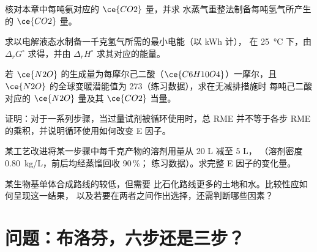 \begin{exercise}[$\star\star$]\label{exo:b3:green-industrial:7}
核对本章中每吨氨对应的 $\ce{CO2}$ 量，并求
水蒸气重整法制备每吨氢气所产生的 $\ce{CO2}$ 量。
\end{exercise}

\begin{exercise}[$\star\star$]\label{exo:b3:green-industrial:8}
求以电解液态水制备一千克氢气所需的最小电能（以 kWh 计），
在 \qty{25}{\celsius} 下，由 $\Delta_rG^\circ$ 求得，并由 $\Delta_rH^\circ$ 求其对应的能量。
\end{exercise}

\begin{exercise}[$\star\star$]\label{exo:b3:green-industrial:9}
若 $\ce{N2O}$ 的生成量为每摩尔己二酸（$\ce{C6H10O4}$）一摩尔，且
$\ce{N2O}$ 的全球变暖潜能值为 273（练习数据），求在无减排措施时
每吨己二酸对应的 $\ce{N2O}$ 量及其 $\ce{CO2}$ 当量。
\end{exercise}

\begin{exercise}[$\star\star\star$]\label{exo:b3:green-industrial:10}
证明：对于一系列步骤，当过量试剂被循环使用时，总 RME
并不等于各步 RME 的乘积，并说明循环使用如何改变
E 因子。
\end{exercise}

\begin{exercise}[$\star\star\star$]\label{exo:b3:green-industrial:11}
某工艺改进将某一步骤中每千克产物的溶剂用量从 20 L 减至 5 L，
（溶剂密度 \qty{0.80}{kg/L}，前后均经蒸馏回收 90\,\%；
练习数据）。求完整 E 因子的变化量。
\end{exercise}

\begin{exercise}[$\star\star\star$]\label{exo:b3:green-industrial:12}
某生物基单体合成路线的较低，但需要
比石化路线更多的土地和水。比较性应如何呈现这一结果，
以及若要在两者之间作出选择，还需判断哪些因素？
\end{exercise}

\section{问题：布洛芬，六步还是三步？}

